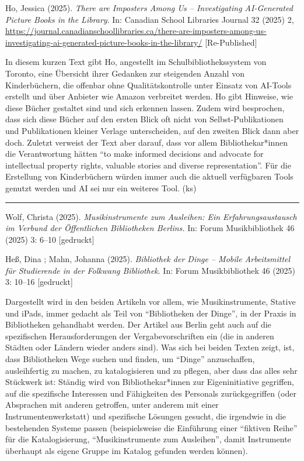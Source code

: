 \documentclass[a4paper,
fontsize=11pt,
oneside,
numbers=noperiodatend,
parskip=half-,
bibliography=totoc,
final
]{scrartcl}
\begin{document}
Ho, Jessica (2025). \emph{There are Imposters Among Us -- Investigating
AI-Generated Picture Books in the Library}. In: Canadian School
Libraries Journal 32 (2025) 2,
\url{https://journal.canadianschoollibraries.ca/there-are-imposters-among-us-investigating-ai-generated-picture-books-in-the-library/}
{[}Re-Published{]}

In diesem kurzen Text gibt Ho, angestellt im Schulbibliothekssystem von
Toronto, eine Übersicht ihrer Gedanken zur steigenden Anzahl von
Kinderbüchern, die offenbar ohne Qualitätskontrolle unter Einsatz von
AI-Tools erstellt und über Anbieter wie Amazon verbreitet werden. Ho
gibt Hinweise, wie diese Bücher gestaltet sind und sich erkennen lassen.
Zudem wird besprochen, dass sich diese Bücher auf den ersten Blick oft
nicht von Selbst-Publikationen und Publikationen kleiner Verlage
unterscheiden, auf den zweiten Blick dann aber doch. Zuletzt verweist
der Text aber darauf, dass vor allem Bibliothekar*innen die
Verantwortung hätten \enquote{to make informed decisions and advocate
for intellectual property rights, valuable stories and diverse
representation}. Für die Erstellung von Kinderbüchern würden immer auch
die aktuell verfügbaren Tools genutzt werden und AI sei nur ein weiteres
Tool. (ks)

\begin{center}\rule{0.5\linewidth}{0.5pt}\end{center}

Wolf, Christa (2025). \emph{Musikinstrumente zum Ausleihen: Ein
Erfahrungsaustausch im Verbund der Öffentlichen Bibliotheken Berlins.}
In: Forum Musikbibliothek 46 (2025) 3: 6--10 {[}gedruckt{]}

Heß, Dina ; Mahn, Johanna (2025). \emph{Bibliothek der Dinge -- Mobile
Arbeitsmittel für Studierende in der Folkwang Bibliothek}. In: Forum
Musikbibliothek 46 (2025) 3: 10--16 {[}gedruckt{]}

Dargestellt wird in den beiden Artikeln vor allem, wie Musikinstrumente,
Stative und iPads, immer gedacht als Teil von \enquote{Bibliotheken der
Dinge}, in der Praxis in Bibliotheken gehandhabt werden. Der Artikel aus
Berlin geht auch auf die spezifischen Herausforderungen der
Vergabevorschriften ein (die in anderen Städten oder Ländern wieder
anders sind). Was sich bei beiden Texten zeigt, ist, dass Bibliotheken
Wege suchen und finden, um \enquote{Dinge} anzuschaffen, ausleihfertig
zu machen, zu katalogisieren und zu pflegen, aber dass das alles sehr
Stückwerk ist: Ständig wird von Bibliothekar*innen zur Eigeninitiative
gegriffen, auf die spezifische Interessen und Fähigkeiten des Personals
zurückgegriffen (oder Absprachen mit anderen getroffen, unter anderem
mit einer Instrumentenwerkstatt) und spezifische Lösungen gesucht, die
irgendwie in die bestehenden Systeme passen (beispielsweise die
Einführung einer \enquote{fiktiven Reihe} für die Katalogisierung,
\enquote{Musikinstrumente zum Ausleihen}, damit Instrumente überhaupt
als eigene Gruppe im Katalog gefunden werden können).
\end{document}

